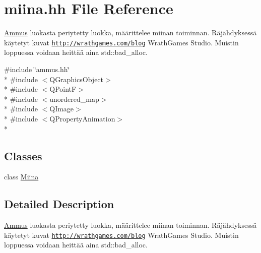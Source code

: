 \hypertarget{miina_8hh}{\section{miina.\-hh File Reference}
\label{miina_8hh}
}


\hyperlink{class_ammus}{Ammus} luokasta periytetty luokka, määrittelee miinan toiminnan. Räjähdyksessä käytetyt kuvat \href{http://wrathgames.com/blog}{\tt http\-://wrathgames.\-com/blog} Wrath\-Games Studio. Muistin loppuessa voidaan heittää aina std\-::bad\-\_\-alloc.  


{\ttfamily \#include \char`\"{}ammus.\-hh\char`\"{}}\\*
{\ttfamily \#include $<$Q\-Graphics\-Object$>$}\\*
{\ttfamily \#include $<$Q\-Point\-F$>$}\\*
{\ttfamily \#include $<$unordered\-\_\-map$>$}\\*
{\ttfamily \#include $<$Q\-Image$>$}\\*
{\ttfamily \#include $<$Q\-Property\-Animation$>$}\\*
\subsection*{Classes}
\begin{DoxyCompactItemize}
\item 
class \hyperlink{class_miina}{Miina}
\end{DoxyCompactItemize}


\subsection{Detailed Description}
\hyperlink{class_ammus}{Ammus} luokasta periytetty luokka, määrittelee miinan toiminnan. Räjähdyksessä käytetyt kuvat \href{http://wrathgames.com/blog}{\tt http\-://wrathgames.\-com/blog} Wrath\-Games Studio. Muistin loppuessa voidaan heittää aina std\-::bad\-\_\-alloc. 